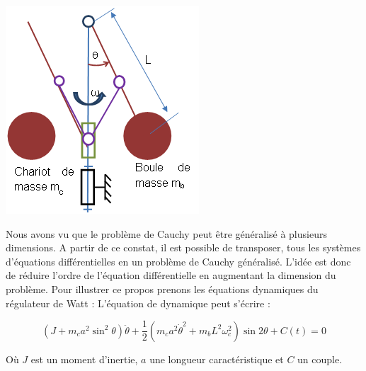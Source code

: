 \documentclass[10pt]{article}
\begin{document}
\begin{minipage}[c]{.25\linewidth}
\begin{center}
\includegraphics[width=.95\textwidth]{images/fig_13}
\end{center}
\end{minipage}
\hfill
\begin{minipage}[c]{.7\linewidth}
Nous avons vu que le problème de Cauchy peut être généralisé à plusieurs dimensions. A partir de ce constat, il est possible de transposer, tous les systèmes d’équations différentielles en un problème de Cauchy généralisé. L’idée est donc de réduire l’ordre de l’équation différentielle en augmentant la dimension du problème.
Pour illustrer ce propos prenons les équations dynamiques du régulateur de Watt :
L’équation de dynamique peut s’écrire :

$$(J+m_c a^2  \sin^2 \theta ) \ddot{\theta}+\dfrac{1}{2} (m_c a^2 \dot{\theta}^2+m_b L^2 \omega_c^2 ) \sin 2\theta +C(t)=0$$

Où $J$ est un moment d’inertie, $a$ une longueur caractéristique et $C$ un couple.
\end{minipage}
\end{document}

